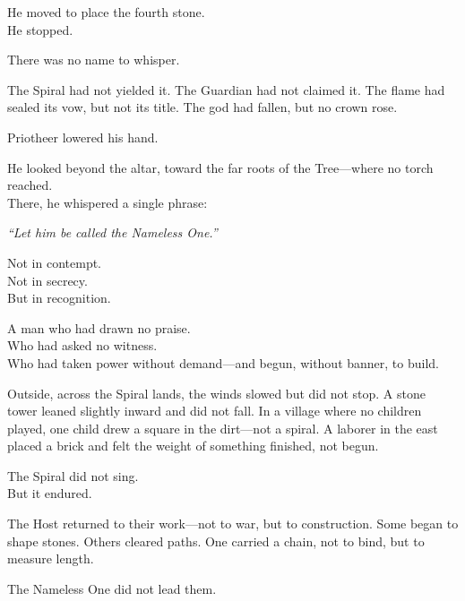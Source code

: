 \documentclass[12pt]{article}
\begin{document}
\vspace{0.5em}
He moved to place the fourth stone.\\
He stopped.

\vspace{0.5em}
There was no name to whisper.

\vspace{0.5em}
The Spiral had not yielded it. The Guardian had not claimed it. The flame had sealed its vow, but not its title. The god had fallen, but no crown rose.

\vspace{0.5em}
Priotheer lowered his hand.

\vspace{0.5em}
He looked beyond the altar, toward the far roots of the Tree---where no torch reached.\\
There, he whispered a single phrase:

\vspace{0.5em}
\textit{``Let him be called the Nameless One.''}

\vspace{0.5em}
Not in contempt.\\
Not in secrecy.\\
But in recognition.

\vspace{0.5em}
A man who had drawn no praise.\\
Who had asked no witness.\\
Who had taken power without demand---and begun, without banner, to build.

\vspace{0.5em}
Outside, across the Spiral lands, the winds slowed but did not stop. A stone tower leaned slightly inward and did not fall. In a village where no children played, one child drew a square in the dirt---not a spiral. A laborer in the east placed a brick and felt the weight of something finished, not begun.

\vspace{0.5em}
The Spiral did not sing.\\
But it endured.

\vspace{0.5em}
The Host returned to their work---not to war, but to construction. Some began to shape stones. Others cleared paths. One carried a chain, not to bind, but to measure length.

\vspace{0.5em}
The Nameless One did not lead them.
\end{document}
